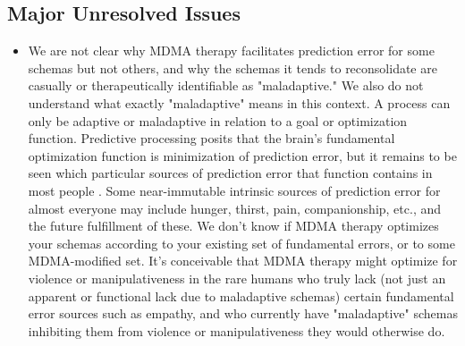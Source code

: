 \documentclass[12pt,letterpaper]{book}
\begin{document}
\subsection*{Major Unresolved Issues}
\begin{itemize}
    \item We are not clear why MDMA therapy facilitates prediction error for some schemas but not others, and why the schemas it tends to reconsolidate are casually or therapeutically identifiable as "maladaptive." We also do not understand what exactly "maladaptive" means in this context. A process can only be adaptive or maladaptive in relation to a goal or optimization function. Predictive processing posits that the brain's fundamental optimization function is minimization of prediction error, but it remains to be seen which particular sources of prediction error that function contains in most people \cite{clark2015surfing}. Some near-immutable intrinsic sources of prediction error for almost everyone may include hunger, thirst, pain, companionship, etc., and the future fulfillment of these. We don't know if MDMA therapy optimizes your schemas according to your existing set of fundamental errors, or to some MDMA-modified set. It's conceivable that MDMA therapy might optimize for violence or manipulativeness in the rare humans who truly lack (not just an apparent or functional lack due to maladaptive schemas) certain fundamental error sources such as empathy, and who currently have "maladaptive" schemas inhibiting them from violence or manipulativeness they would otherwise do.
    

\end{itemize}
\end{document}
